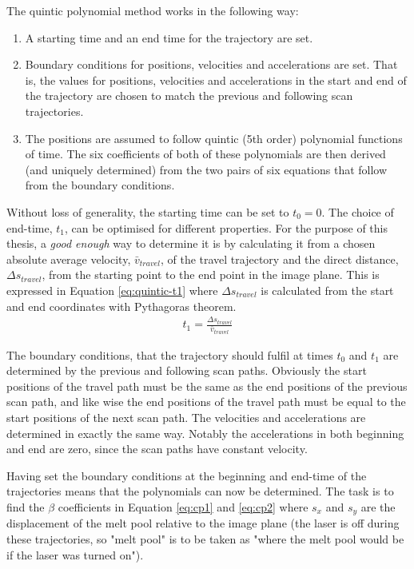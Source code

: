 The quintic polynomial method works in the following way:
\begin{enumerate}
    \item A starting time and an end time for the trajectory are set.
    \item Boundary conditions for positions, velocities and accelerations are set. That is, the values for positions, velocities and accelerations in the start and end of the trajectory are chosen to match the previous and following scan trajectories.
    \item The positions are assumed to follow quintic (5th order) polynomial functions of time. The six coefficients of both of these polynomials are then derived (and uniquely determined) from the two pairs of six equations that follow from the boundary conditions.
\end{enumerate}

Without loss of generality, the starting time can be set to $t_0 = 0$. The choice of end-time,  $t_1$, can be optimised for different properties. For the purpose of this thesis, a \textit{good enough} way to determine it is by calculating it from a chosen absolute average velocity, $\bar{v}_{travel}$, of the travel trajectory and the direct distance, $\Delta s_{travel}$, from the starting point to the end point in the image plane. This is expressed in Equation \ref{eq:quintic-t1} where $\Delta s_{travel}$ is calculated from the start and end coordinates with Pythagoras theorem.
\begin{align}
    t_1 = \frac{\Delta s_{travel}}{\bar{v}_{travel}} \label{eq:quintic-t1}
\end{align}

The boundary conditions, that the trajectory should fulfil at times $t_0$ and $t_1$ are determined by the previous and following scan paths. Obviously the start positions of the travel path must be the same as the end positions of the previous scan path, and like wise the end positions of the travel path must be equal to the start positions of the next scan path. The velocities and accelerations are determined in exactly the same way. Notably the accelerations in both beginning and end are zero, since the scan paths have constant velocity.

Having set the boundary conditions at the beginning and end-time of the trajectories means that the polynomials can now be determined. The task is to find the $\beta$ coefficients in Equation \ref{eq:cp1} and \ref{eq:cp2} where $s_x$ and $s_y$ are the displacement of the melt pool relative to the image plane (the laser is off during these trajectories, so "melt pool" is to be taken as "where the melt pool would be if the laser was turned on").

